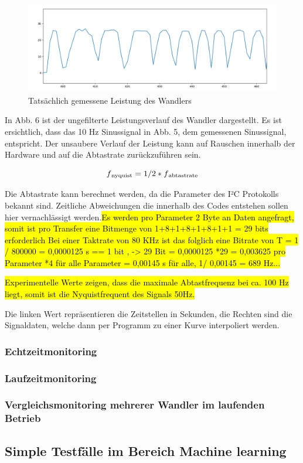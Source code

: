 \begin{figure}
    \centering
    \includegraphics[height= 4cm, width = 12cm]{Pictures/TatsDaten.png}
    \caption{Tatsächlich gemessene Leistung des Wandlers}
\end{figure}

\begin{flushleft}

In Abb. 6 ist der ungefilterte Leistungsverlauf des Wandler dargestellt. Es ist ersichtlich, dass das 10 Hz Sinussignal in Abb. 5, dem gemessenen Sinussignal, entspricht. Der unsaubere Verlauf der Leistung kann auf Rauschen innerhalb der Hardware und auf die Abtastrate zurückzuführen sein. 
\end{flushleft}


\begin{equation}
\label{Sigmoid}
f\textsubscript{nyquist} = 1/2 * f\textsubscript{abtastrate}
\end{equation}

\begin{flushleft}
Die Abtastrate kann berechnet werden, da die Parameter des I²C Protokolls bekannt sind. Zeitliche Abweichungen die innerhalb des Codes entstehen sollen hier vernachlässigt werden.\hl{Es werden pro Parameter 2 Byte an Daten angefragt, somit ist pro Transfer eine Bitmenge von 1+8+1+8+1+8+1+1 = 29 bits erforderlich Bei einer Taktrate von 80 KHz ist das folglich eine Bitrate von T = 1 / 800000 = 0,0000125 s == 1 bit , -> 29 Bit = 0,0000125 *29 = 0,003625 pro Parameter *4 für alle Parameter = 0,00145 s für alle, 1/ 0,00145 = 689 Hz...} 

\hl{Experimentelle Werte zeigen, dass die maximale Abtastfrequenz bei ca. 100 Hz liegt, somit ist die Nyquistfrequent des Signals 50Hz.}

Die linken Wert repräsentieren die Zeitstellen in Sekunden, die Rechten sind die Signaldaten, welche dann per Programm zu einer Kurve interpoliert werden. 
\end{flushleft}

\subsubsection{Echtzeitmonitoring}

\subsubsection{Laufzeitmonitoring}

\subsubsection{Vergleichsmonitoring mehrerer Wandler im laufenden Betrieb}

\subsection{Simple Testfälle im Bereich Machine learning}
